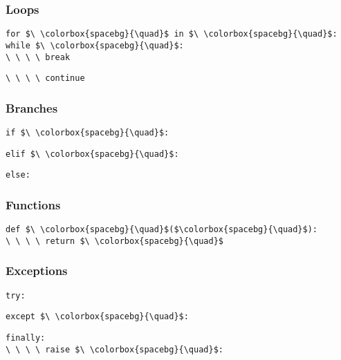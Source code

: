 \documentclass[12pt,twocolumn]{article}
\begin{document}
	\begin{minipage}[t]{0.23\textwidth}
		\subsubsection*{Loops}
		
		\colorbox{codebg}{\lstinline|for $\ \colorbox{spacebg}{\quad}$ in $\ \colorbox{spacebg}{\quad}$:|} \\
		
		\colorbox{codebg}{\lstinline|while $\ \colorbox{spacebg}{\quad}$:|} \\
		
		\colorbox{codebg}{\lstinline|\ \ \ \ break|}
		\vspace{1mm}
		
		\colorbox{codebg}{\lstinline|\ \ \ \ continue|} \\
		
		\subsubsection*{Branches}
		
		\colorbox{codebg}{\lstinline|if $\ \colorbox{spacebg}{\quad}$:|}
		\vspace{1mm}
		
		\colorbox{codebg}{\lstinline|elif $\ \colorbox{spacebg}{\quad}$:|}
		\vspace{1mm}
		
		\colorbox{codebg}{\lstinline|else:|}
	\end{minipage}
	\hfill
	\begin{minipage}[t]{0.2\textwidth}
		\subsubsection*{Functions}
		
		\colorbox{codebg}{\lstinline|def $\ \colorbox{spacebg}{\quad}$($\colorbox{spacebg}{\quad}$):|} \\
		
		\colorbox{codebg}{\lstinline|\ \ \ \ return $\ \colorbox{spacebg}{\quad}$|} \\
		
		\subsubsection*{Exceptions}
		
		\colorbox{codebg}{\lstinline|try:|}
		\vspace{1mm}
		
		\colorbox{codebg}{\lstinline|except $\ \colorbox{spacebg}{\quad}$:|}
		\vspace{1mm}
		
		
		\colorbox{codebg}{\lstinline|finally:|} \\
		
		\colorbox{codebg}{\lstinline|\ \ \ \ raise $\ \colorbox{spacebg}{\quad}$:|}
	\end{minipage}
	
\end{document}
